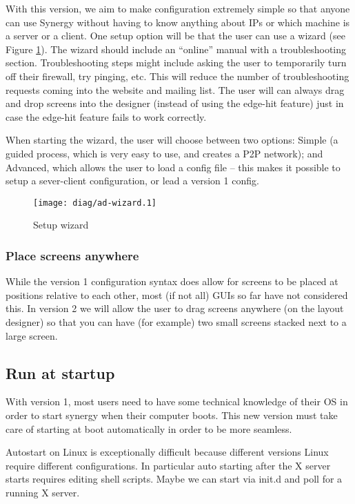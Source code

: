 With this version, we aim to make configuration extremely simple so that anyone
can use Synergy without having to know anything about IPs or which machine is a
server or a client. One setup option will be that the user can use a wizard (see
Figure \ref{fig:setupWizard}). The wizard should include an ``online'' manual 
with a troubleshooting section. Troubleshooting steps might include asking the 
user to temporarily turn off their firewall, try pinging, etc. This will reduce
the number of troubleshooting requests coming into the website and mailing list.
The user will can always drag and drop screens into the designer (instead of
using the edge-hit feature) just in case the edge-hit feature fails to work
correctly.

When starting the wizard, the user will choose between two options: Simple (a
guided process, which is very easy to use, and creates a P2P network); and
Advanced, which allows the user to load a config file -- this makes it possible
to setup a sever-client configuration, or lead a version 1 config.

\begin{figure}[ht!]
  \centering
  \texttt{[image: diag/ad-wizard.1]}
  \caption{Setup wizard}
  \label{fig:setupWizard}
\end{figure}

\subsubsection{Place screens anywhere}

While the version 1 configuration syntax does allow for screens to be placed at
positions relative to each other, most (if not all) GUIs so far have not 
considered this. In version 2 we will allow the user to drag screens anywhere
(on the layout designer) so that you can have (for example) two small screens
stacked next to a large screen.

\subsection{Run at startup}

With version 1, most users need to have some technical knowledge of their OS
in order to start synergy when their computer boots. This new version must
take care of starting at boot automatically in order to be more seamless.

Autostart on Linux is exceptionally difficult because different versions Linux 
require different configurations. In particular auto starting after the X server
starts requires editing shell scripts. Maybe we can start via init.d and poll 
for a running X server.

